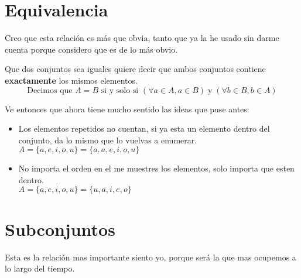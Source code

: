 \documentclass[12pt, fleqn]{report}                             %
\begin{document}
        \section{Equivalencia}

            Creo que esta relación es más que obvia, tanto que ya la he usado sin darme cuenta
            porque considero que es de lo más obvio.

            Que dos conjuntos sea iguales quiere decir que ambos conjuntos contiene
            \textbf{exactamente} los mismos elementos.
            \begin{equation*}
                \text{Decimos que }
                A = B 
                \text{ si y solo si }
                (\forall a \in A, a \in B) \;\text{y}\; (\forall b \in B, b \in A)
            \end{equation*}

            Ve entonces que ahora tiene mucho sentido las ideas que puse antes:

            \begin{itemize}
                \item Los elementos repetidos no cuentan, si ya esta un elemento dentro del
                    conjunto, da lo mismo que lo vuelvas a enumerar.\\
                    $A = \{a, e, i, o, u\} = \{a, a, e, i, o, u\}$

                \item No importa el orden en el me muestres los elementos,
                    solo importa que esten dentro.\\
                    $A = \{a, e, i, o, u\} = \{u, a, i, e, o\}$
            \end{itemize}


        \clearpage
        \section{Subconjuntos}

            Esta es la relación mas importante siento yo, porque será la que mas ocupemos a lo largo
            del tiempo.
\end{document}
